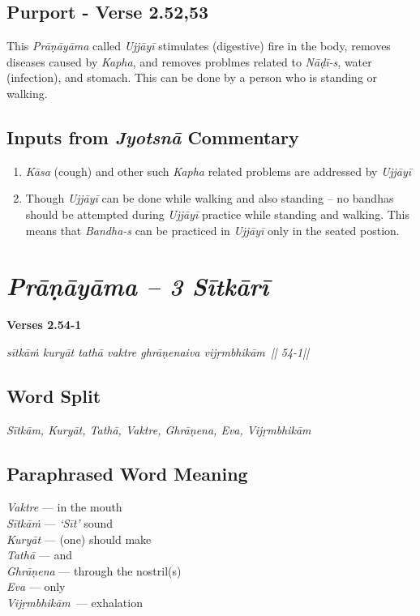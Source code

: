 \subsection*{Purport - Verse 2.52,53}


This \textit{Prāṇāyāma} called \textit{Ujjāyī} stimulates (digestive) fire in the body, removes diseases caused by \textit{Kapha}, and removes problmes related to \textit{Nāḍī-s}, water (infection), and stomach. This can be done by a person who is standing or walking.

\subsection*{Inputs from \textit{Jyotsnā} Commentary}


\begin{enumerate}
\item \textit{Kāsa} (cough) and other such \textit{Kapha} related problems are addressed by \textit{Ujjāyī} 
\item Though \textit{Ujjāyī} can be done while walking and also standing – no bandhas should be attempted during \textit{Ujjāyī} practice while standing and walking. This means that \textit{Bandha-s} can be practiced in \textit{Ujjāyī} only in the seated postion. 
\end{enumerate}

\section*{\textit{Prāṇāyāma -- 3 Sītkārī}}

\noindent \textbf{Verses 2.54-1 }

\begin{center}
\textit{sītkāṁ kuryāt tathā vaktre ghrāṇenaiva vijṛmbhikām || 54-1||}
\end{center}

\subsection*{Word Split}


\textit{Sītkām, Kuryāt, Tathā, Vaktre, Ghrāṇena, Eva, Vijṛmbhikām}

\subsection*{Paraphrased Word Meaning}


\begin{multicols}{2}
\textit{Vaktre} --- in the mouth \\
\textit{Sītkāṁ} --- \textit{‘Sīt’} sound \\
\textit{Kuryāt} --- (one) should make \\
\textit{Tathā}  --- and \\
\textit{Ghrāṇena} --- through the nostril(s)\\
\textit{Eva} --- only \\
\textit{Vijṛmbhikām }--- exhalation
\end{multicols}

